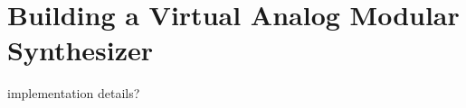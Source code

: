 \chapter[Modular Synthesizer]{Building a Virtual Analog Modular Synthesizer}\label{chapter:building-a-mod-synth}

implementation details?